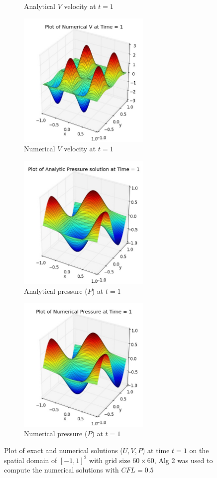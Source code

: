 \begin{figure}[H]
\begin{subfigure}[t]{2.5in}
		\caption{Analytical $V$ velocity at $t=1$}\label{fig:6.1c}
	\end{subfigure}
	\quad
	\begin{subfigure}[t]{2.5in}
		\centering
		\includegraphics[width=2.5in]{figures/Pm1a_pf2_vf_t_1_grid_60 - Copy.jpg}
		\caption{Numerical $V$ velocity at $t=1$}\label{fig:6.1d}
	\end{subfigure}
	\quad	
	\begin{subfigure}[t]{2.5in}
		\centering
		\includegraphics[width=2.5in]{figures/Pm1a_pf2_P_exact_t_1_grid_60 - Copy.jpg}
		\caption{Analytical pressure ($P$) at $t=1$}\label{fig:6.1e}
	\end{subfigure}
	\quad	
	\begin{subfigure}[t]{2.5in}
		\centering
		\includegraphics[width=2.5in]{figures/Pm1a_pf2_pf_t_1_grid_60 - Copy.jpg}
		\caption{Numerical pressure ($P$) at $t=1$}\label{fig:6.1f}
	\end{subfigure}
	\caption{Plot of exact and numerical solutions ($U,V,P$) at time $t=1$ on the spatial domain of $[-1,1]^2$ with grid size $60 \times 60$, Alg 2 was used to compute the numerical solutions with $CFL=0.5$}\label{fig:6.1}
\end{figure}

